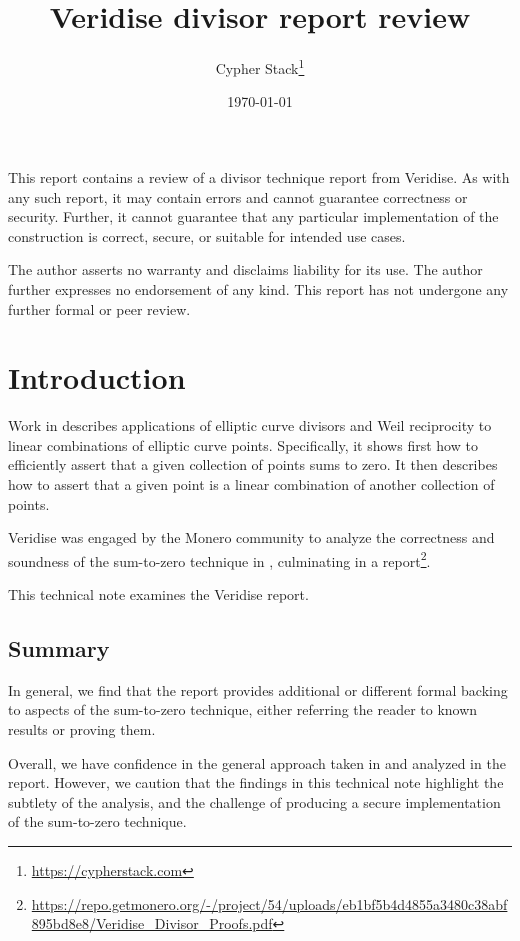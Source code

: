 \documentclass{article}
\title{Veridise divisor report review}
\author{Cypher Stack\thanks{\url{https://cypherstack.com}}}
\date{\today}
\begin{document}
\maketitle

This report contains a review of a divisor technique report from Veridise.
As with any such report, it may contain errors and cannot guarantee correctness or security.
Further, it cannot guarantee that any particular implementation of the construction is correct, secure, or suitable for intended use cases.

The author asserts no warranty and disclaims liability for its use.
The author further expresses no endorsement of any kind.
This report has not undergone any further formal or peer review.

\tableofcontents


\section{Introduction}

Work in \cite{ecip} describes applications of elliptic curve divisors and Weil reciprocity to linear combinations of elliptic curve points.
Specifically, it shows first how to efficiently assert that a given collection of points sums to zero.
It then describes how to assert that a given point is a linear combination of another collection of points.

Veridise was engaged by the Monero community to analyze the correctness and soundness of the sum-to-zero technique in \cite{ecip}, culminating in a report\footnote{\url{https://repo.getmonero.org/-/project/54/uploads/eb1bf5b4d4855a3480c38abf895bd8e8/Veridise_Divisor_Proofs.pdf}}.

This technical note examines the Veridise report.


\subsection{Summary}

In general, we find that the report provides additional or different formal backing to aspects of the sum-to-zero technique, either referring the reader to known results or proving them.

Overall, we have confidence in the general approach taken in \cite{ecip} and analyzed in the report.
However, we caution that the findings in this technical note highlight the subtlety of the analysis, and the challenge of producing a secure implementation of the sum-to-zero technique.
\end{document}
